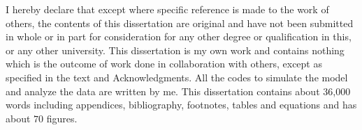 
\begin{declaration}

I hereby declare that except where specific reference is made to the work of 
others, the contents of this dissertation are original and have not been 
submitted in whole or in part for consideration for any other degree or 
qualification in this, or any other university. This dissertation is my own 
work and contains nothing which is the outcome of work done in collaboration 
with others, except as specified in the text and Acknowledgments. All the codes to simulate the model and analyze the data are written by me. 
This dissertation contains about 36,000 words including appendices, 
bibliography, footnotes, tables and equations and has about $70$ figures.




\end{declaration}